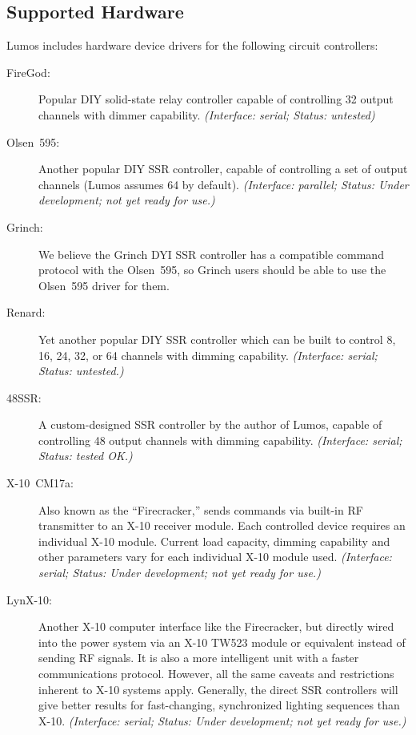 \documentclass{article}
\begin{document}
\subsection{Supported Hardware}
Lumos includes hardware device drivers for the following circuit controllers:
\begin{description}
 \item[FireGod:] Popular DIY solid-state relay controller capable of
  controlling 32 output channels with dimmer capability.
  {\em (Interface: serial; Status: untested)\/}
 \item[Olsen~595:] Another popular DIY SSR controller, capable of controlling
  a set of output channels (Lumos assumes 64 by default).
  {\em (Interface: parallel; Status: Under development; not yet ready for use.)\/}
 \item[Grinch:] We believe the Grinch DYI SSR controller has a compatible
  command protocol with the Olsen~595, so Grinch users should be able to use
  the Olsen~595 driver for them.
 \item[Renard:] Yet another popular DIY SSR controller which can be built
  to control 8, 16, 24, 32, or 64 channels with dimming capability.
  {\em (Interface: serial; Status: untested.)\/}
 \item[48SSR:] A custom-designed SSR controller by the author of Lumos, 
  capable of controlling 48 output channels with dimming capability.
  {\em (Interface: serial; Status: tested OK.)\/}
 \item[X-10~CM17a:] Also known as the ``Firecracker,'' sends commands via 
  built-in RF transmitter to an X-10 receiver module.  Each controlled device
  requires an individual X-10 module.  Current load capacity, dimming
  capability and other parameters vary for each individual X-10 module used.
  {\em (Interface: serial; Status: Under development; not yet ready for use.)\/}
 \item[LynX-10:] Another X-10 computer interface like the Firecracker, but
  directly wired into the power system via an X-10 TW523 module or equivalent
  instead of sending RF signals.  It is also a more intelligent unit with a
  faster communications protocol.  However, all the same caveats and
  restrictions inherent to X-10 systems apply.  Generally, the direct SSR
  controllers will give better results for fast-changing, synchronized
  lighting sequences than X-10.
  {\em (Interface: serial; Status: Under development; not yet ready for use.)\/}
\end{description}
\end{document}
